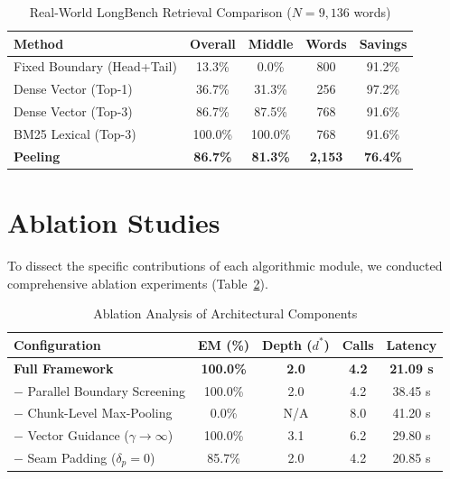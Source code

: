 \begin{table}[htbp]
\centering
\caption{Real-World LongBench Retrieval Comparison ($N=9,136$ words)}
\label{tab:longbench}
\small
\begin{tabularx}{\columnwidth}{Xcccc}
\toprule
\textbf{Method} & \textbf{Overall} & \textbf{Middle} & \textbf{Words} & \textbf{Savings} \\
\midrule
Fixed Boundary (Head+Tail) & 13.3\% & 0.0\% & 800 & 91.2\% \\
Dense Vector (Top-1) & 36.7\% & 31.3\% & 256 & 97.2\% \\
Dense Vector (Top-3) & 86.7\% & 87.5\% & 768 & 91.6\% \\
BM25 Lexical (Top-3) & 100.0\% & 100.0\% & 768 & 91.6\% \\
\textbf{\RBER{} Peeling} & \textbf{86.7\%} & \textbf{81.3\%} & \textbf{2,153} & \textbf{76.4\%} \\
\bottomrule
\end{tabularx}
\end{table}

\section{Ablation Studies}
\label{sec:ablations}

To dissect the specific contributions of each algorithmic module, we conducted comprehensive ablation experiments (Table~\ref{tab:ablations}).

\begin{table}[htbp]
\centering
\caption{Ablation Analysis of Architectural Components}
\label{tab:ablations}
\small
\begin{tabularx}{\columnwidth}{Xcccc}
\toprule
\textbf{Configuration} & \textbf{EM (\%)} & \textbf{Depth ($d^*$)} & \textbf{Calls} & \textbf{Latency} \\
\midrule
\textbf{Full \RBER{} Framework} & \textbf{100.0\%} & \textbf{2.0} & \textbf{4.2} & \textbf{21.09 s} \\
\quad $-$ Parallel Boundary Screening & 100.0\% & 2.0 & 4.2 & 38.45 s \\
\quad $-$ Chunk-Level Max-Pooling & 0.0\% & N/A & 8.0 & 41.20 s \\
\quad $-$ Vector Guidance ($\gamma \to \infty$) & 100.0\% & 3.1 & 6.2 & 29.80 s \\
\quad $-$ Seam Padding ($\delta_p = 0$) & 85.7\% & 2.0 & 4.2 & 20.85 s \\
\bottomrule
\end{tabularx}
\end{table}

